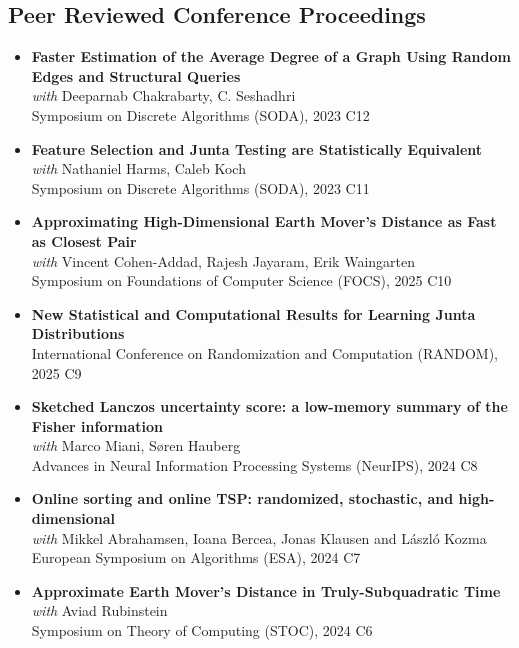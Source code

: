 \documentclass[paper=a4,fontsize=11pt]{article} %
\begin{document}
\subsection*{Peer Reviewed Conference Proceedings}
\begin{itemize}[leftmargin=0.5em,itemsep=0.3em,label={}]
    \item \textbf{Faster Estimation of the Average Degree of a Graph Using Random Edges and Structural Queries}\\ 
  \textit{with} Deeparnab Chakrabarty, C. Seshadhri \\
  Symposium on Discrete Algorithms (SODA), 2023 \hfill C12

    \item \textbf{Feature Selection and Junta Testing are Statistically Equivalent}\\ 
  \textit{with} Nathaniel Harms, Caleb Koch  \\
  Symposium on Discrete Algorithms (SODA), 2023 \hfill C11

    \item \textbf{Approximating High-Dimensional Earth Mover's Distance as Fast as Closest Pair}\\ 
  \textit{with} Vincent Cohen-Addad, Rajesh Jayaram, Erik Waingarten \\
    Symposium on Foundations of Computer Science (FOCS), 2025 \hfill C10
    
    \item \textbf{New Statistical and Computational Results for Learning Junta Distributions}\\ 
    International Conference on Randomization and Computation (RANDOM), 2025 \hfill C9
    
    \item \textbf{Sketched Lanczos uncertainty score: a low-memory summary of the Fisher information}\\ 
  \textit{with} Marco Miani, Søren Hauberg \\
    Advances in Neural Information Processing Systems (NeurIPS), 2024 \hfill C8

    \item \textbf{Online sorting and online TSP: randomized, stochastic, and high-dimensional}\\ 
    \textit{with} Mikkel Abrahamsen, Ioana Bercea, Jonas Klausen and László Kozma \\
    European Symposium on Algorithms (ESA), 2024 \hfill C7
    
    \item \textbf{Approximate Earth Mover's Distance in Truly-Subquadratic Time} \\ 
    \textit{with} Aviad Rubinstein \\
    Symposium on Theory of Computing (STOC), 2024 \hfill C6
    

\end{itemize}
\end{document}
